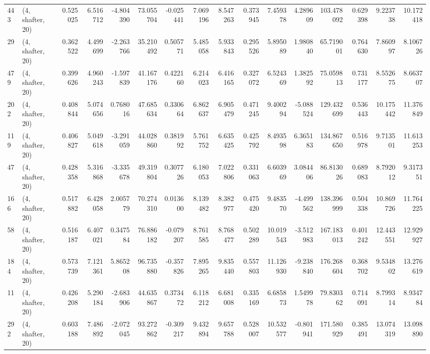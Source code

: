 \begin{tabular}{llrrrrrrrrrrrrrr}
443 &  (4, shafter, 20) &   0.525025 &   6.516712 &  -4.804390 &    73.055704 &  -0.025441 &   7.069196 &   8.547263 &  0.373945 &   7.459378 &   4.289609 &   103.478092 &   0.629398 &   9.223738 &  10.172418 \\
29  &  (4, shafter, 20) &   0.362522 &   4.499699 &  -2.263766 &    35.210492 &   0.505771 &   5.485058 &   5.933843 &  0.295526 &   5.895089 &   1.980840 &    65.719001 &   0.764630 &   7.860997 &   8.106726 \\
479 &  (4, shafter, 20) &   0.399626 &   4.960243 &  -1.597839 &    41.167176 &   0.422160 &   6.214023 &   6.416165 &  0.327072 &   6.524369 &   1.382592 &    75.059813 &   0.731177 &   8.552675 &   8.663707 \\
202 &  (4, shafter, 20) &   0.408844 &   5.074656 &   0.768016 &    47.685634 &   0.330664 &   6.862637 &   6.905479 &  0.471245 &   9.400294 &  -5.088524 &   129.432699 &   0.536443 &  10.175442 &  11.376849 \\
119 &  (4, shafter, 20) &   0.406827 &   5.049618 &  -3.291059 &    44.028860 &   0.381992 &   5.761752 &   6.635425 &  0.425792 &   8.493598 &   6.365183 &   134.867650 &   0.516978 &   9.713501 &  11.613253 \\
47  &  (4, shafter, 20) &   0.428358 &   5.316868 &  -3.335678 &    49.319804 &   0.307726 &   6.180053 &   7.022806 &  0.331063 &   6.603969 &   3.084406 &    86.813026 &   0.689083 &   8.792012 &   9.317351 \\
166 &  (4, shafter, 20) &   0.517882 &   6.428058 &   2.005779 &    70.274310 &   0.013600 &   8.139482 &   8.382977 &  0.475420 &   9.483570 &  -4.499562 &   138.396999 &   0.504338 &  10.869726 &  11.764225 \\
58  &  (4, shafter, 20) &   0.516187 &   6.407021 &   0.347584 &    76.886182 &  -0.079207 &   8.761585 &   8.768477 &  0.502289 &  10.019543 &  -3.512983 &   167.183013 &   0.401242 &  12.443551 &  12.929927 \\
184 &  (4, shafter, 20) &   0.573739 &   7.121361 &   5.865208 &    96.735880 &  -0.357826 &   7.895265 &   9.835440 &  0.557803 &  11.126930 &  -9.238840 &   176.268604 &   0.368702 &   9.534802 &  13.276619 \\
11  &  (4, shafter, 20) &   0.426208 &   5.290184 &  -2.683906 &    44.635867 &   0.373472 &   6.118212 &   6.681008 &  0.335169 &   6.685873 &   1.549978 &    79.830362 &   0.714091 &   8.799314 &   8.934784 \\
292 &  (4, shafter, 20) &   0.603188 &   7.486892 &  -2.072045 &    93.272862 &  -0.309217 &   9.432894 &   9.657788 &  0.528007 &  10.532577 &  -0.801941 &   171.580929 &   0.385491 &  13.074319 &  13.098890 \\

\end{tabular}
